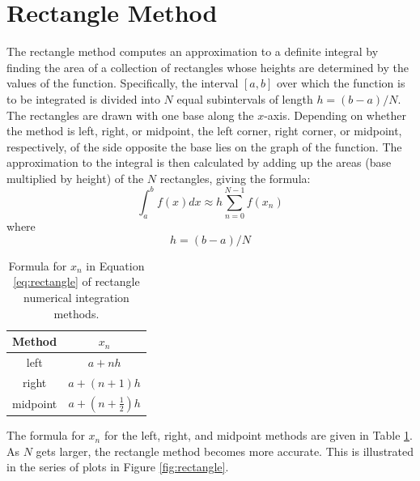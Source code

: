 \label{Numerical_Integration}

\section{Rectangle Method}
The rectangle method computes an approximation to a 
definite integral by finding the area of a collection of rectangles whose heights are determined 
by the values of the function.  Specifically, the interval $[a,b]$ over which the function is to 
be integrated is divided into $N$ equal subintervals of length $h = (b-a)/N$. The rectangles are 
drawn with one base along the $x$-axis. Depending on whether the method is left, right, or midpoint,
the left corner, right corner, or midpoint, respectively, of the side opposite the base lies on the 
graph of the function. The approximation to the integral is 
then calculated by adding up the areas (base multiplied by height) of the $N$ rectangles, giving the formula:
\begin{equation}
\int_a^b f(x) dx \approx h \sum_{n=0}^{N-1} f(x_n) \label{eq:rectangle}
\end{equation}
where
\begin{equation}
h=(b-a)/N 
\end{equation}

\begin{table}[htbp]
\centering
\caption{Formula for $x_n$ in Equation \ref{eq:rectangle} of rectangle numerical integration methods.} \label{tab:xn-rectangle}
\begin{tabular}{cc}
\textbf{Method} & \textbf{$x_n$} \\ \toprule
left & $a+nh$ \\ \midrule
right & $a+(n+1)h$ \\ \midrule
midpoint & $a+\left(n + \frac{1}{2}\right)h$ \\ \bottomrule
\end{tabular}
\end{table}

The formula for $x_n$ for the left, right, and midpoint methods are given in Table \ref{tab:xn-rectangle}.
As $N$ gets larger, the rectangle method becomes more accurate. This is illustrated in the series of plots
in Figure \ref{fig:rectangle}.

